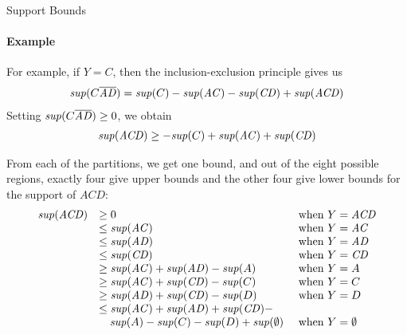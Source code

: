 \begin{frame}{Support Bounds}
\framesubtitle{Example}

 For example, if $Y=C$, then the inclusion-exclusion principle
  gives us
  \begin{align*}
\mathit{sup}(C\overline{\mathit{AD}}) = \mathit{sup}(C) - \mathit{sup}(\mathit{AC}) - \mathit{sup}(\mathit{CD}) + \mathit{sup}(\mathit{ACD})
\end{align*}
Setting $\mathit{sup}(C\overline{\mathit{AD}}) \ge 0$, we obtain
  \begin{align*}
\mathit{sup}(\mathit{ACD}) \ge  -\mathit{sup}(C) + \mathit{sup}(\mathit{AC}) + \mathit{sup} (\mathit{CD})
\end{align*}

\medskip

From each of the partitions, we
get one bound, and out of the eight possible regions, exactly four give
upper bounds and the other four give lower bounds for the support of $\mathit{ACD}$:
\begin{align*}
\begin{array}{lll}
    \mathit{sup}(\mathit{ACD}) & \geq 0                   & \mbox{ when } Y=\mathit{ACD}\\
    &\leq \mathit{sup}(\mathit{AC})                     & \mbox{ when } Y=\mathit{AC}\\
    &\leq \mathit{sup}(\mathit{AD})                  & \mbox{ when } Y=\mathit{AD}\\
    &\leq \mathit{sup}(\mathit{CD})                     & \mbox{ when } Y=\mathit{CD}\\
    &\geq \mathit{sup}(\mathit{AC}) +\mathit{sup}(\mathit{AD}) - \mathit{sup}(A)   & \mbox{ when } Y=A\\
    &\geq \mathit{sup}(\mathit{AC}) + \mathit{sup}(\mathit{CD}) - \mathit{sup}(C)  & \mbox{ when } Y=C\\
    &\geq \mathit{sup}(\mathit{AD}) +\mathit{sup}(\mathit{CD}) - \mathit{sup}(D)   & \mbox{ when } Y=D\\
    &\leq \mathit{sup}(\mathit{AC}) + \mathit{sup}(\mathit{AD}) + \mathit{sup}(\mathit{CD})- \\
    & \quad \mathit{sup}(A) - \mathit{sup}(C) - \mathit{sup}(D)
    + \mathit{sup}(\emptyset) &\mbox{ when } Y=\emptyset\\
\end{array}
\end{align*}

\end{frame}




